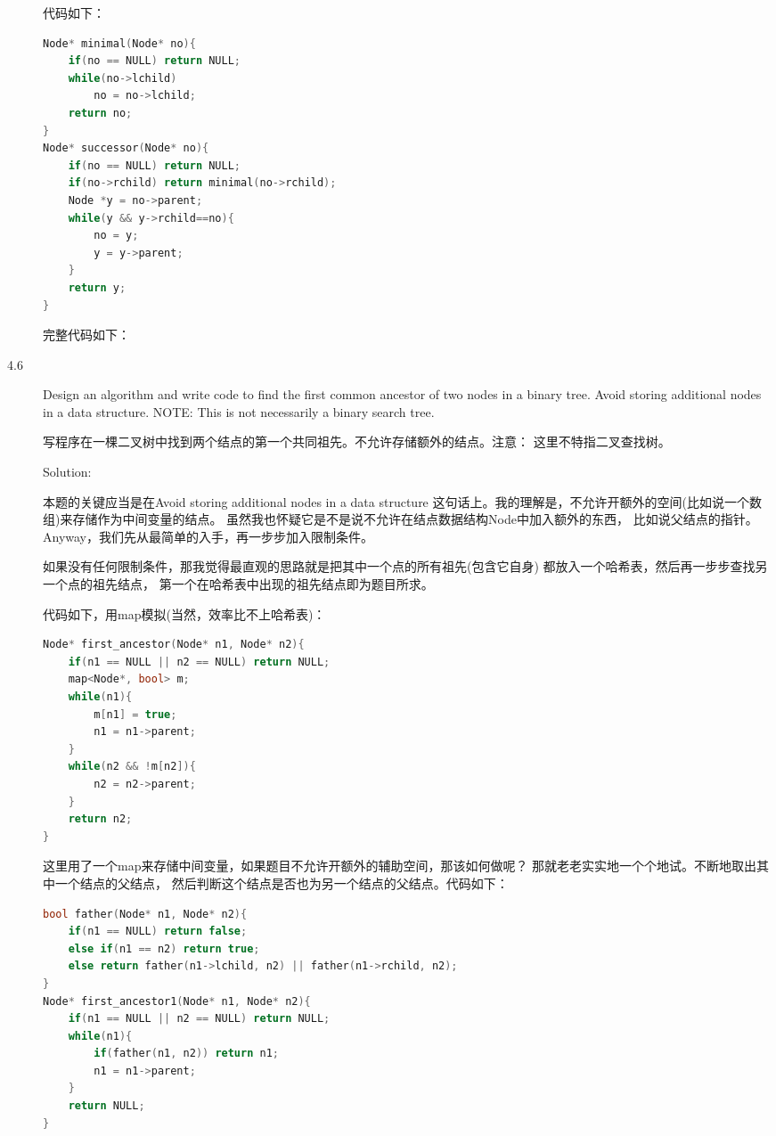 \begin{description}
代码如下：
\begin{lstlisting}[language=C++]
Node* minimal(Node* no){
    if(no == NULL) return NULL;
    while(no->lchild)
        no = no->lchild;
    return no;
}
Node* successor(Node* no){
    if(no == NULL) return NULL;
    if(no->rchild) return minimal(no->rchild);
    Node *y = no->parent;
    while(y && y->rchild==no){
        no = y;
        y = y->parent;
    }
    return y;
}
\end{lstlisting}

完整代码如下：




\item[4.6] Design an algorithm and write code to find the first common ancestor of two nodes in a binary tree. Avoid storing additional nodes in a data structure. NOTE: This is not necessarily a binary search tree.

写程序在一棵二叉树中找到两个结点的第一个共同祖先。不允许存储额外的结点。注意： 这里不特指二叉查找树。

Solution: 

本题的关键应当是在Avoid storing additional nodes in a data structure 这句话上。我的理解是，不允许开额外的空间(比如说一个数组)来存储作为中间变量的结点。 虽然我也怀疑它是不是说不允许在结点数据结构Node中加入额外的东西， 比如说父结点的指针。Anyway，我们先从最简单的入手，再一步步加入限制条件。

如果没有任何限制条件，那我觉得最直观的思路就是把其中一个点的所有祖先(包含它自身) 都放入一个哈希表，然后再一步步查找另一个点的祖先结点， 第一个在哈希表中出现的祖先结点即为题目所求。

代码如下，用map模拟(当然，效率比不上哈希表)：
\begin{lstlisting}[language=C++]
Node* first_ancestor(Node* n1, Node* n2){
    if(n1 == NULL || n2 == NULL) return NULL;
    map<Node*, bool> m;
    while(n1){
        m[n1] = true;
        n1 = n1->parent;
    }
    while(n2 && !m[n2]){
        n2 = n2->parent;
    }
    return n2;
}
\end{lstlisting}

这里用了一个map来存储中间变量，如果题目不允许开额外的辅助空间，那该如何做呢？ 那就老老实实地一个个地试。不断地取出其中一个结点的父结点， 然后判断这个结点是否也为另一个结点的父结点。代码如下：

\begin{lstlisting}[language=C++]
bool father(Node* n1, Node* n2){
    if(n1 == NULL) return false;
    else if(n1 == n2) return true;
    else return father(n1->lchild, n2) || father(n1->rchild, n2);
}
Node* first_ancestor1(Node* n1, Node* n2){
    if(n1 == NULL || n2 == NULL) return NULL;
    while(n1){
        if(father(n1, n2)) return n1;
        n1 = n1->parent;
    }
    return NULL;
}
\end{lstlisting}


\end{description}
